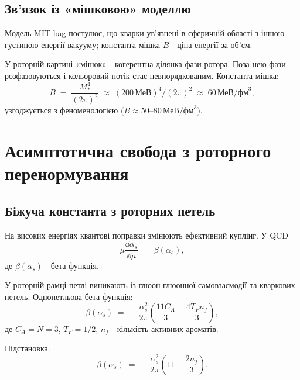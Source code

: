 \documentclass[11pt,a4paper]{article}
\theoremstyle{definition}
\theoremstyle{plain}
\theoremstyle{remark}
\begin{document}
\subsection{Зв’язок із «мішковою» моделлю}

Модель MIT bag постулює, що кварки ув’язнені в сферичній області з іншою густиною енергії вакууму; константа мішка $B$—ціна енергії за об’єм.

У роторній картині «мішок»—когерентна ділянка фази ротора. Поза нею фази розфазовуються і кольоровий потік стає невпорядкованим. Константа мішка:
\begin{equation}
B \;=\; \frac{M_\ast^4}{(2\pi)^2} \;\approx\; (200\,\text{МеВ})^4/(2\pi)^2 \;\approx\; 60\,\text{МеВ/фм}^3,
\end{equation}
узгоджується з феноменологією ($B \approx 50$–$80\,\text{МеВ/фм}^3$).

\vspace{1em}

\section{Асимптотична свобода з роторного перенормування}
\label{sec:asymptotic-freedom}

\subsection{Біжуча константа з роторних петель}

На високих енергіях квантові поправки змінюють ефективний куплінг. У QCD
\begin{equation}
\mu \frac{\dd\alpha_s}{\dd\mu} \;=\; \beta(\alpha_s),
\label{eq:rge}
\end{equation}
де $\beta(\alpha_s)$—бета-функція.

У роторній рамці петлі виникають із глюон-глюонної самовзаємодії та кваркових петель. Однопетльова бета-функція:
\begin{equation}
\beta(\alpha_s) \;=\; -\frac{\alpha_s^2}{2\pi}\left(\frac{11C_A}{3} - \frac{4T_F n_f}{3}\right),
\label{eq:beta-function}
\end{equation}
де $C_A=N=3$, $T_F=1/2$, $n_f$—кількість активних ароматів.

Підстановка:
\begin{equation}
\beta(\alpha_s) \;=\; -\frac{\alpha_s^2}{2\pi}\left(11 - \frac{2n_f}{3}\right).
\label{eq:beta-qcd}
\end{equation}
\end{document}
